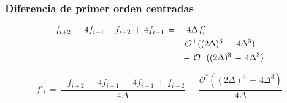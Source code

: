\documentclass[9pt,technote,twoside,letterpaper,onecolumn]{IEEEtran}
\begin{document}
\begin{multicols}{2}
\subsubsection{Diferencia de primer orden centradas}
\label{sec:dif1D2Oc}
\begin{align}
  f_{i+2}\,-\,4f_{i+1}-f_{i-2}\,+\,4f_{i-1}&\,=\,-\,4\Delta f'_i\notag\\
  &\quad+\,\mathcal{O}^+((2\Delta)^3\,-\,4\Delta^3)\notag\\
  &\qquad-\,\mathcal{O}^-((2\Delta)^3\,-\,4\Delta^3)\notag
\end{align}

\begin{equation}
  f'_i\,=\,\frac{-f_{i+2}\,+\,4f_{i+1}\,-\,4f_{i-1}\,+\,f_{i-2}}{4\Delta}\,-\,\frac{\mathcal{O}^*((2\Delta)^3\,-\,4\Delta^3)}{4\Delta}
  \label{eq:2ordC}
\end{equation}


\end{multicols}
\end{document}

